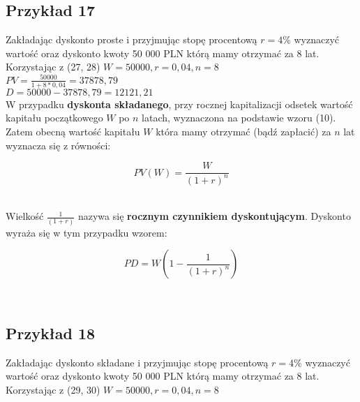 \documentclass{article}
\begin{document}
\subsection{Przykład 17}

Zakładając dyskonto proste i przyjmując stopę procentową $ r = 4 \% $ wyznaczyć wartość oraz dyskonto kwoty 50 000 PLN którą mamy otrzymać za 8 lat.\\

Korzystając z (27, 28) $ W = 50 000, r = 0,04, n = 8 $\\

$ PV = \frac{50 000}{1 + 8 * 0,04} = 37 878,79 $ \\

$ D = 50 000 - 37 878,79 = 12 121,21 $\\

W przypadku \textbf{dyskonta składanego}, przy rocznej kapitalizacji odsetek wartość kapitału początkowego $ W $ po $ n $ latach, wyznaczona na podstawie wzoru (10).\\

Zatem obecną wartość kapitału $ W $ która mamy otrzymać (bądź zapłacić) za $ n $ lat wyznacza się z równości:

\begin{center}
	\begin{equation}
		PV(W) = \frac{W}{(1 + r)^n}
	\end{equation}
\end{center}\\

Wielkość $ \frac{1}{(1 + r)} $ nazywa się \textbf{rocznym czynnikiem dyskontującym}. Dyskonto wyraża się w tym przypadku wzorem:

\begin{center}
	\begin{equation}
		PD = W(1 - \frac{1}{(1 + r)^n})
	\end{equation}
\end{center}\\

\subsection{Przykład 18}

Zakładając dyskonto składane i przyjmując stopę procentową $ r = 4 \% $ wyznaczyć wartość oraz dyskonto kwoty 50 000 PLN którą mamy otrzymać za 8 lat.\\

Korzystając z (29, 30) $ W = 50 000, r = 0,04, n = 8 $\\
\end{document}
